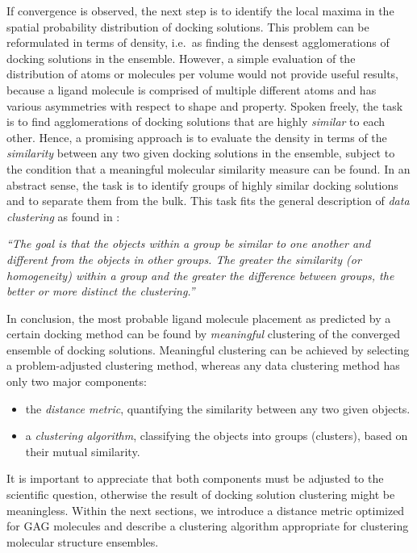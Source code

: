 If convergence is observed, the next step is to identify the local maxima in the
spatial probability distribution of docking solutions. This problem can be
reformulated in terms of density, i.e.\ as finding the densest agglomerations of
docking solutions in the ensemble. However, a simple evaluation of the
distribution of atoms or molecules per volume would not provide useful results,
because a ligand molecule is comprised of multiple different atoms and has
various asymmetries with respect to shape and property. Spoken freely, the task
is to find agglomerations of docking solutions that are highly \textit{similar}
to each other. Hence, a promising approach is to evaluate the density in terms
of the \textit{similarity} between any two given docking solutions in the
ensemble, subject to the condition that a meaningful molecular similarity
measure can be found. In an abstract sense, the task is to identify groups of
highly similar docking solutions and to separate them from the bulk. This task
fits the general description of \textit{data clustering} as found in
\cite{tan_data_mining}:

\begin{adjustwidth}{1.5cm}{1.5cm}
\textit{%
\enquote{The goal is that the objects within a group be similar to one another
and different from the objects in other groups. The greater the similarity (or
homogeneity) within a group and the greater the difference between groups, the
better or more distinct the clustering.}}
\end{adjustwidth}

In conclusion, the most probable ligand molecule placement as predicted by a
certain docking method can be found by \textit{meaningful} clustering of the
converged ensemble of docking solutions. Meaningful clustering can be achieved
by selecting a problem-adjusted clustering method, whereas any data clustering
method has only two major components:

\begin{itemize}
\item the \textit{distance metric}, quantifying the similarity between any two
given objects.
\item a \textit{clustering algorithm}, classifying the objects into groups
(clusters), based on their mutual similarity.
\end{itemize}

It is important to appreciate that both components must be adjusted to the
scientific question, otherwise the result of docking solution clustering might
be meaningless. Within the next sections, we introduce a distance metric
optimized for GAG molecules and describe a clustering algorithm appropriate for
clustering molecular structure ensembles.


